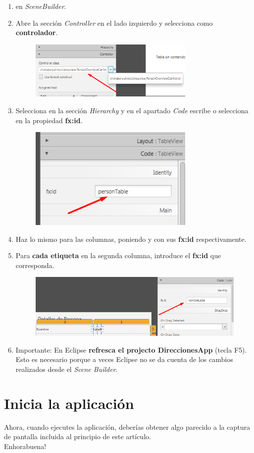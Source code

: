 \begin{enumerate}
	\item {} en \textit{SceneBuilder}.
	\item Abre la sección \textit{Controller} en el lado izquierdo y selecciona  como \textbf{controlador}.
	\begin{figure}[H]
		\includegraphics[width=8cm]{img/selectController}
	\end{figure}
	\item Selecciona  en la sección \textit{Hierarchy} y en el apartado \textit{Code} escribe o selecciona  en la propiedad \textbf{fx:id}.
	\begin{figure}[H]
		\includegraphics[width=8cm]{img/personTable}
	\end{figure}
	\item Haz lo mismo para las columnas, poniendo  y  con sus \textbf{fx:id} respectivamente.
	\item Para \textbf{cada etiqueta} en la segunda columna, introduce el \textbf{fx:id} que corresponda.
	\begin{figure}[H]
		\includegraphics[width=12cm]{img/nombreLabel}
	\end{figure}
	\item Importante: En Eclipse \textbf{refresca el projecto DireccionesApp} (tecla F5). Esto es necesario porque a veces Eclipse no se da cuenta de los cambios realizados desde el \textit{Scene Builder}.
\end{enumerate}

\section{Inicia la aplicación}
Ahora, cuando ejecutes la aplicación, deberías obtener algo parecido a la captura de pantalla incluida al principio de este artículo.\\

Enhorabuena!



